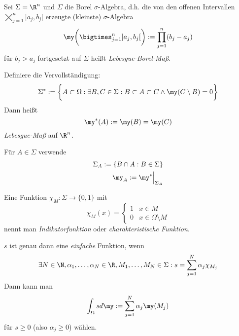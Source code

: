 \documentclass{mycourse}
\begin{document}
\begin{ex}[Anwendung]
	Sei $\Sigma = \R^n$ und $\Sigma$ die Borel $\sigma$-Algebra, d.h. die von den offenen Intervallen $\bigtimes_{j=1}^n ]a_j,b_j[$ erzeugte (kleinste) $\sigma$-Algebra
	\[
		\my \bigg( \bigtimes_{j=1}^n ]a_j,b_j[ \bigg) := \prod_{j=1}^n (b_j - a_j)
	\]
	für $b_j > a_j$ fortgesetzt auf $\Sigma$ heißt \emph{Lebesgue-Borel-Maß}.

	Definiere die Vervollständigung:
	\[
		\Sigma^* := \bigg\{ A \subset \Omega : \exists B,C \in \Sigma : B \subset A \subset C \land \my(C \setminus B) = 0 \bigg\}
	\]
	Dann heißt
	\[
		\my^*(A) := \my(B) = \my(C)
	\]
	\emph{Lebesgue-Maß} auf $\R^n$.

	Für $A \in \Sigma$ verwende
	\begin{align*}
		\Sigma_A := \{ B \cap A : B \in \Sigma \} \\
		\my_A := \my^* \Big|_{\Sigma_A}
	\end{align*}
\end{ex}

\begin{df*}
	Eine Funktion $\chi_M: \Sigma \to \{0,1\}$ mit
	\[
		\chi_M (x) = \begin{cases}
			1 & x\in M \\
			0 & x \in \Omega \setminus M
		\end{cases}
	\]
	nennt man \emph{Indikatorfunktion} oder \emph{charakteristische Funktion}.

	$s$ ist genau dann eine \emph{einfache} Funktion, wenn
	\[
		\exists N \in \N, \alpha_1, \dotsc, \alpha_N \in \R, M_1, \dotsc, M_N \in \Sigma : s = \sum_{j=1}^N \alpha_j \chi_{M_j}
	\]
	Dann kann man
	\[
		\int_{\Omega} s d\my := \sum_{j=1}^N \alpha_j \my(M_j)
	\]
	für $s \ge 0$ (also  $\alpha_j \ge 0$) wählen.
\end{df*}
\end{document}
